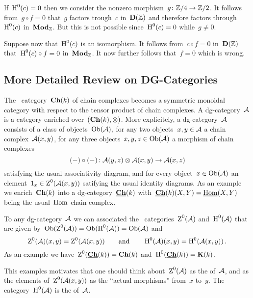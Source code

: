 \documentclass[a4paper,10pt]{scrartcl}
\begin{document}
If~$\operatorname{H}^0(c) = 0$ then we consider the nonzero morphism~$g \colon \mathbb{Z}/4 \to \mathbb{Z}/2$.
It follows from~$g \circ f = 0$ that~$g$ factors trough~$c$ in~$\mathbf{D}(\mathbb{Z})$ and therefore factors through~$\operatorname{H}^0(c)$ in~$\mathbf{Mod}_{\mathbb{Z}}$.
But this is not possible since~$\operatorname{H}^0(c) = 0$ while~$g \neq 0$.

Suppose now that~$\operatorname{H}^0(c)$ is an isomorphism.
It follows from~$c \circ f = 0$ in~$\mathbf{D}(\mathbb{Z})$ that~$\operatorname{H}^0(c) \circ f = 0$ in~$\mathbf{Mod}_{\mathbb{Z}}$.
It now further follows that~$f = 0$ which is wrong.



\subsection{More Detailed Review on DG-Categories}
\label{detailed dg review}

The~{\klinear} category~$\mathbf{Ch}(k)$ of chain complexes becomes a symmetric monoidal category with respect to the tensor product of chain complexes.
A dg-category~$\mathcal{A}$ is a category enriched over~$(\mathbf{Ch}(k), \otimes)$.
More explicitely, a dg-category~$\mathcal{A}$ consists of a class of objects~$\operatorname{Ob}(\mathcal{A})$, for any two objects~$x, y \in \mathcal{A}$ a chain complex~$\mathcal{A}(x,y)$, for any three objects~$x, y, z \in \operatorname{Ob}(\mathcal{A})$ a morphism of chain complexes
\[
  (-) \circ (-)
  \colon
  \mathcal{A}(y,z) \otimes \mathcal{A}(x,y)
  \to
  \mathcal{A}(x,z)
\]
satisfying the usual associativity diagram, and for every object~$x \in \operatorname{Ob}(\mathcal{A})$ an element~$1_x \in \operatorname{Z}^0(\mathcal{A}(x,y))$ satifying the usual identity diagrams.
As an example we enrich~$\mathbf{Ch}(k)$ into a dg-category~$\underline{\mathbf{Ch}}(k)$ with~$\underline{\mathbf{Ch}}(k)(X,Y) = \underline{\operatorname{Hom}}(X,Y)$ being the usual~$\operatorname{Hom}$-chain complex.

To any dg-category~$\mathcal{A}$ we can associated the~{\klinear} categories~$\operatorname{Z}^0(\mathcal{A})$ and~$\operatorname{H}^0(\mathcal{A})$ that are given by~$\operatorname{Ob}(\operatorname{Z}^0(\mathcal{A})) = \operatorname{Ob}(\operatorname{H}^0(\mathcal{A})) = \operatorname{Ob}(\mathcal{A})$ and
\[
  \operatorname{Z}^0(\mathcal{A})(x,y)
  =
  \operatorname{Z}^0(\mathcal{A}(x,y))
  \qquad\text{and}\qquad
  \operatorname{H}^0(\mathcal{A})(x,y)
  =
  \operatorname{H}^0(\mathcal{A}(x,y)) \,.
\]
As an example we have~$\operatorname{Z}^0(\underline{\mathbf{Ch}}(k)) = \mathbf{Ch}(k)$ and~$\operatorname{H}^0(\underline{\mathbf{Ch}}(k)) = \mathbf{K}(k)$.

This examples motivates that one should think about~$\operatorname{Z}^0(\mathcal{A})$ as the  of~$\mathcal{A}$, and as the elements of~$\operatorname{Z}^0(\mathcal{A}(x,y))$ as the \enquote{actual morphisms} from~$x$ to~$y$.
The category~$\operatorname{H}^0(\mathcal{A})$ is the  of~$\mathcal{A}$.
\end{document}
